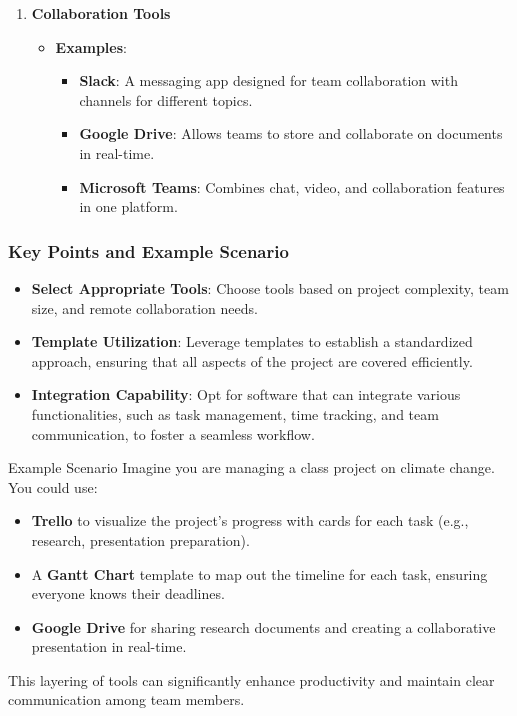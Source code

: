 \documentclass[aspectratio=169]{beamer}
\begin{document}
\begin{frame}[fragile]
\begin{enumerate}
        \item \textbf{Collaboration Tools}
            \begin{itemize}
                \item \textbf{Examples}:
                    \begin{itemize}
                        \item \textbf{Slack}: A messaging app designed for team collaboration with channels for different topics.
                        \item \textbf{Google Drive}: Allows teams to store and collaborate on documents in real-time.
                        \item \textbf{Microsoft Teams}: Combines chat, video, and collaboration features in one platform.
                    \end{itemize}
            \end{itemize}
    \end{enumerate}
\end{frame}

\begin{frame}[fragile]
    \frametitle{Key Points and Example Scenario}
    \begin{itemize}
        \item \textbf{Select Appropriate Tools}: Choose tools based on project complexity, team size, and remote collaboration needs.
        \item \textbf{Template Utilization}: Leverage templates to establish a standardized approach, ensuring that all aspects of the project are covered efficiently.
        \item \textbf{Integration Capability}: Opt for software that can integrate various functionalities, such as task management, time tracking, and team communication, to foster a seamless workflow.
    \end{itemize}
    
    \begin{block}{Example Scenario}
        Imagine you are managing a class project on climate change. You could use:
        \begin{itemize}
            \item \textbf{Trello} to visualize the project's progress with cards for each task (e.g., research, presentation preparation).
            \item A \textbf{Gantt Chart} template to map out the timeline for each task, ensuring everyone knows their deadlines.
            \item \textbf{Google Drive} for sharing research documents and creating a collaborative presentation in real-time.
        \end{itemize}
        This layering of tools can significantly enhance productivity and maintain clear communication among team members.
    \end{block}
\end{frame}
\end{document}
